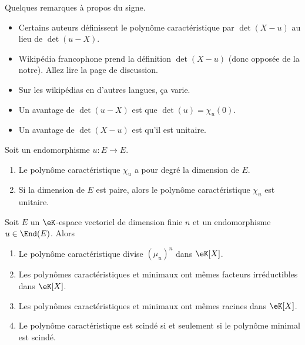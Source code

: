 \begin{remark}
	Quelques remarques à propos du signe.
	\begin{itemize}
		\item
		      Certains auteurs définissent le polynôme caractéristique par \( \det(X-u)\) au lieu de \( \det(u-X)\).
		\item
		      Wikipédia francophone\cite{BIBooYPTLooZlMfAG} prend la définition \( \det(X-u)\) (donc opposée de la notre). Allez lire la page de discussion.
		\item
		      Sur les wikipédias en d'autres langues, ça varie.
		\item
		      Un avantage de \( \det(u-X)\) est que \( \det(u)=\chi_u(0)\).
		\item
		      Un avantage de \( \det(X-u)\) est qu'il est unitaire.
	\end{itemize}
\end{remark}

\begin{lemma}       \label{LemooWCZMooZqyaHd}
	Soit un endomorphisme \(u \colon E\to E  \).
	\begin{enumerate}
		\item		\label{ITEMooAALOooGlQYOs}
		      Le polynôme caractéristique \( \chi_u\) a pour degré la dimension de \( E\).
		\item
		      Si la dimension de \( E\) est paire, alors le polynôme caractéristique \( \chi_u\) est unitaire.
	\end{enumerate}
\end{lemma}

\begin{theorem}     \label{ThoNhbrUL}
	Soit \( E\) un \(\eK\)-espace vectoriel de dimension finie \( n\) et un endomorphisme \( u\in\End(E)\). Alors
	\begin{enumerate}
		\item
		      Le polynôme caractéristique divise \( (\mu_u)^n\) dans \(\eK[X]\).
		\item
		      Les polynômes caractéristiques et minimaux ont mêmes facteurs irréductibles dans \(\eK[X]\).
		\item
		      Les polynômes caractéristiques et minimaux ont mêmes racines dans \(\eK[X]\).
		\item
		      Le polynôme caractéristique est scindé si et seulement si le polynôme minimal est scindé.
	\end{enumerate}
\end{theorem}

